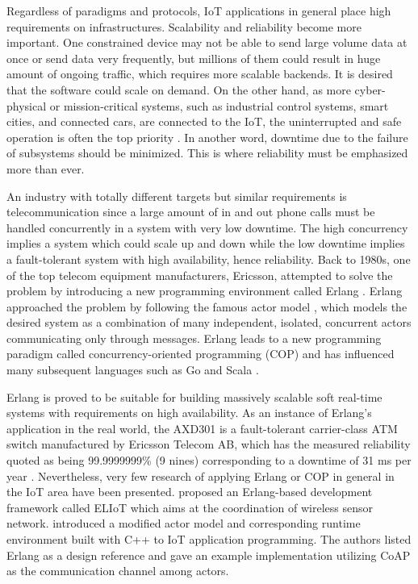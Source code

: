 Regardless of paradigms and protocols, IoT applications in general place high requirements on infrastructures. Scalability and reliability become more important. One constrained device may not be able to send large volume data at once or send data very frequently, but millions of them could result in huge amount of ongoing traffic, which requires more scalable backends. It is desired that the software could scale on demand. On the other hand, as more cyber-physical or mission-critical systems, such as industrial control systems, smart cities, and connected cars, are connected to the IoT, the uninterrupted and safe operation is often the top priority \autocite{7498684}. In another word, downtime due to the failure of subsystems should be minimized. This is where reliability must be emphasized more than ever. 

An industry with totally different targets but similar requirements is telecommunication since a large amount of in and out phone calls must be handled concurrently in a system with very low downtime. The high concurrency implies a system which could scale up and down while the low downtime implies a fault-tolerant system with high availability, hence reliability. Back to 1980s, one of the top telecom equipment manufacturers, Ericsson, attempted to solve the problem by introducing a new programming environment called Erlang \autocite{erl}. Erlang approached the problem by following the famous actor model \autocite{agha1986actors}, which models the desired system as a combination of many independent, isolated, concurrent actors communicating only through messages. Erlang leads to a new programming paradigm called concurrency-oriented programming (COP) \autocite{armstrong2003concurrency} and has influenced many subsequent languages such as Go \autocite{go} and Scala \autocite{scala}.  

Erlang is proved to be suitable for building massively scalable soft real-time systems with requirements on high availability. As an instance of Erlang's application in the real world, the AXD301 is a fault-tolerant carrier-class ATM switch manufactured by Ericsson Telecom AB, which has the measured reliability quoted as being 99.9999999\% (9 nines) corresponding to a downtime of 31 ms per year \autocite{armstrong2003concurrency}. Nevertheless, very few research of applying Erlang or COP in general in the IoT area have been presented. \textcite{Sivieri:2012:DPT:2667049.2667051} proposed an Erlang-based development framework called ELIoT which aims at the coordination of wireless sensor network. \textcite{7034296} introduced a modified actor model and corresponding runtime environment built with C++ to IoT application programming. The authors listed Erlang as a design reference and gave an example implementation utilizing CoAP as the communication channel among actors.  

